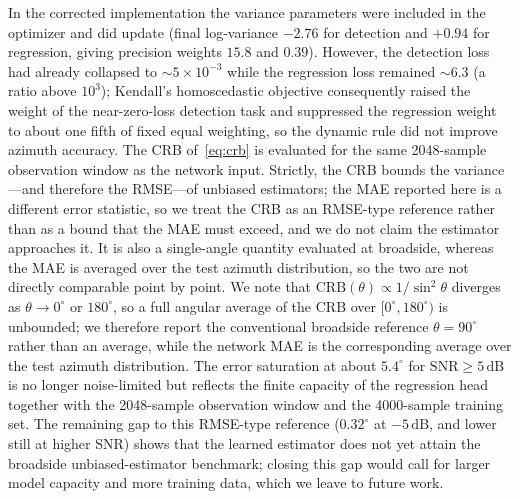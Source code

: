 \documentclass[5p,twocolumn]{elsarticle}
\begin{document}
In the corrected implementation the variance parameters were included in the optimizer and did update (final log-variance $-2.76$ for detection and $+0.94$ for regression, giving precision weights $15.8$ and $0.39$). However, the detection loss had already collapsed to $\sim5\times10^{-3}$ while the regression loss remained $\sim6.3$ (a ratio above $10^3$); Kendall's homoscedastic objective consequently raised the weight of the near-zero-loss detection task and suppressed the regression weight to about one fifth of fixed equal weighting, so the dynamic rule did not improve azimuth accuracy. The CRB of~\eqref{eq:crb} is evaluated for the same 2048-sample observation window as the network input. Strictly, the CRB bounds the variance---and therefore the RMSE---of unbiased estimators; the MAE reported here is a different error statistic, so we treat the CRB as an RMSE-type reference rather than as a bound that the MAE must exceed, and we do not claim the estimator approaches it. It is also a single-angle quantity evaluated at broadside, whereas the MAE is averaged over the test azimuth distribution, so the two are not directly comparable point by point. We note that $\mathrm{CRB}(\theta)\propto1/\sin^2\theta$ diverges as $\theta\to0^\circ$ or $180^\circ$, so a full angular average of the CRB over $[0^\circ,180^\circ)$ is unbounded; we therefore report the conventional broadside reference $\theta=90^\circ$ rather than an average, while the network MAE is the corresponding average over the test azimuth distribution. The error saturation at about $5.4^\circ$ for $\mathrm{SNR}\ge5\,\mathrm{dB}$ is no longer noise-limited but reflects the finite capacity of the regression head together with the 2048-sample observation window and the 4000-sample training set. The remaining gap to this RMSE-type reference ($0.32^\circ$ at $-5\,\mathrm{dB}$, and lower still at higher SNR) shows that the learned estimator does not yet attain the broadside unbiased-estimator benchmark; closing this gap would call for larger model capacity and more training data, which we leave to future work.
\end{document}
